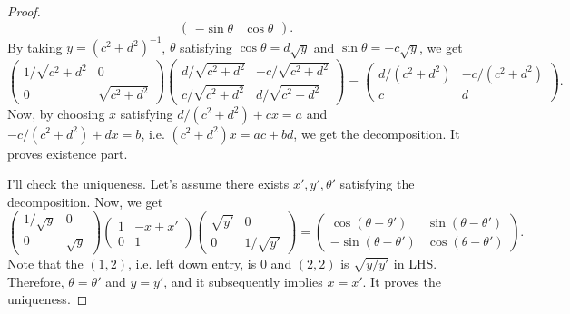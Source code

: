 \documentclass[a4paper, 12pt]{article}
\theoremstyle{Mydefinition}
\theoremstyle{Mytheorem}
\begin{document}
\begin{enumerate}
\begin{proof}
\begin{equation}
\begin{pmatrix}
                -\sin\theta & \cos \theta
            \end{pmatrix}.
    \end{equation}
    By taking $y=(c^2+d^2)^{-1}$, $\theta$ satisfying $\cos\theta = d\sqrt{y}$ and $\sin\theta = -c\sqrt{y}$, we get
    \begin{equation}
         \begin{pmatrix}
                1/\sqrt{c^2+d^2} & 0\\
                0 & \sqrt{c^2+d^2}
            \end{pmatrix}
            \begin{pmatrix}
                d/\sqrt{c^2+d^2} & -c/\sqrt{c^2+d^2} \\
                c/\sqrt{c^2+d^2} & d/\sqrt{c^2+d^2}
            \end{pmatrix}
            =
            \begin{pmatrix}
               d/(c^2+d^2) & -c/(c^2+d^2)\\
               c & d
            \end{pmatrix}.
    \end{equation}
    Now, by choosing $x$ satisfying $d/(c^2+d^2)+cx = a$ and $-c/(c^2+d^2)+dx = b$, i.e. $(c^2+d^2)x = ac+bd$, we get the decomposition. It proves existence part.
    
    I'll check the uniqueness. Let's assume there exists $x',y',\theta'$ satisfying the decomposition. Now, we get
    \begin{equation}
            \begin{pmatrix}
                1/\sqrt{y} & 0\\
                0 & \sqrt{y}
            \end{pmatrix}\begin{pmatrix}
                1 & -x+x'\\
                0 & 1
            \end{pmatrix}
            \begin{pmatrix}
                \sqrt{y'} & 0\\
                0 & 1/\sqrt{y'}
            \end{pmatrix}
            =
            \begin{pmatrix}
                \cos(\theta-\theta') & \sin(\theta-\theta') \\
                -\sin(\theta-\theta') & \cos (\theta-\theta')
            \end{pmatrix}.
    \end{equation}
    Note that the $(1,2)$, i.e. left down entry, is $0$ and $(2,2)$ is $\sqrt{y/y'}$ in LHS. Therefore, $\theta=\theta'$ and $y=y'$, and it subsequently implies $x=x'$. It proves the uniqueness.
    

\end{proof}
\end{enumerate}
\end{document}
